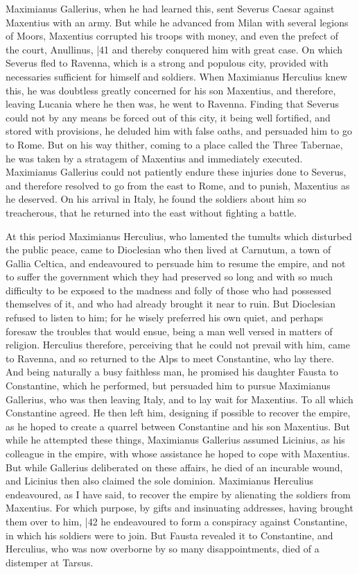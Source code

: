 Maximianus Gallerius, when he had learned this, sent Severus Caesar against Maxentius with an army. But while he advanced from Milan with several legions of Moors, Maxentius corrupted his troops with money, and even the prefect of the court, Anullinus,
|41 and thereby conquered him with great case. On which Severus fled to Ravenna, which is a strong and populous city, provided with necessaries sufficient for himself and soldiers. When Maximianus Herculius knew this, he was doubtless greatly concerned for his son Maxentius, and therefore, leaving Lucania where he then was, he went to Ravenna. Finding that Severus could not by any means be forced out of this city, it being well fortified, and stored with provisions, he deluded him with false oaths, and persuaded him to go to Rome. But on his way thither, coming to a place called the Three Tabernae, he was taken by a stratagem of Maxentius and immediately executed. Maximianus Gallerius could not patiently endure these injuries done to Severus, and therefore resolved to go from the east to Rome, and to punish, Maxentius as he deserved. On his arrival in Italy, he found the soldiers about him so treacherous, that he returned into the east without fighting a battle.

At this period Maximianus Herculius, who lamented the tumults which disturbed the public peace, came to Dioclesian who then lived at Carnutum, a town of Gallia Celtica, and endeavoured to persuade him to resume the empire, and not to suffer the government which they had preserved so long and with so much difficulty to be exposed to the madness and folly of those who had possessed themselves of it, and who had already brought it near to ruin. But Dioclesian refused to listen to him; for he wisely preferred his own quiet, and perhaps foresaw the troubles that would ensue, being a man well versed in matters of religion. Herculius therefore, perceiving that he could not prevail with him, came to Ravenna, and so returned to the Alps to meet Constantine, who lay there. And being naturally a busy faithless man, he promised his daughter Fausta to Constantine, which he performed, but persuaded him to pursue Maximianus Gallerius, who was then leaving Italy, and to lay wait for Maxentius. To all which Constantine agreed. He then left him, designing if possible to recover the empire, as he hoped to create a quarrel between Constantine and his son Maxentius. But while he attempted these things, Maximianus Gallerius assumed Licinius, as his colleague in the empire, with whose assistance he hoped to cope with Maxentius. But while Gallerius deliberated on these affairs, he died of an incurable wound, and Licinius then also claimed the sole dominion. Maximianus Herculius endeavoured, as I have said, to recover the empire by alienating the soldiers from Maxentius. For which purpose, by gifts and insinuating addresses, having brought them over to him,
|42 he endeavoured to form a conspiracy against Constantine, in which his soldiers were to join. But Fausta revealed it to Constantine, and Herculius, who was now overborne by so many disappointments, died of a distemper at Tarsus.

